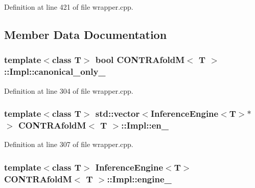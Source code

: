Definition at line 421 of file wrapper.\+cpp.



\subsection{Member Data Documentation}
\hypertarget{struct_c_o_n_t_r_afold_m_1_1_impl_ab91edfe6d89438fdb6bf2edb6eeaa199}{
\subsubsection[{canonical\+\_\+only\+\_\+}]{\setlength{\rightskip}{0pt plus 5cm}template$<$class T$>$ bool {\bf C\+O\+N\+T\+R\+Afold\+M}$<$ T $>$\+::Impl\+::canonical\+\_\+only\+\_\+}}\label{struct_c_o_n_t_r_afold_m_1_1_impl_ab91edfe6d89438fdb6bf2edb6eeaa199}


Definition at line 304 of file wrapper.\+cpp.

\hypertarget{struct_c_o_n_t_r_afold_m_1_1_impl_a340457442751e450885b41148f2f8d04}{
\subsubsection[{en\+\_\+}]{\setlength{\rightskip}{0pt plus 5cm}template$<$class T$>$ std\+::vector$<${\bf Inference\+Engine}$<$T$>$$\ast$$>$ {\bf C\+O\+N\+T\+R\+Afold\+M}$<$ T $>$\+::Impl\+::en\+\_\+}}\label{struct_c_o_n_t_r_afold_m_1_1_impl_a340457442751e450885b41148f2f8d04}


Definition at line 307 of file wrapper.\+cpp.

\hypertarget{struct_c_o_n_t_r_afold_m_1_1_impl_acd8955919fbf8c8f9d86fc195a00cdb0}{
\subsubsection[{engine\+\_\+}]{\setlength{\rightskip}{0pt plus 5cm}template$<$class T$>$ {\bf Inference\+Engine}$<$T$>$ {\bf C\+O\+N\+T\+R\+Afold\+M}$<$ T $>$\+::Impl\+::engine\+\_\+}}\label{struct_c_o_n_t_r_afold_m_1_1_impl_acd8955919fbf8c8f9d86fc195a00cdb0}


